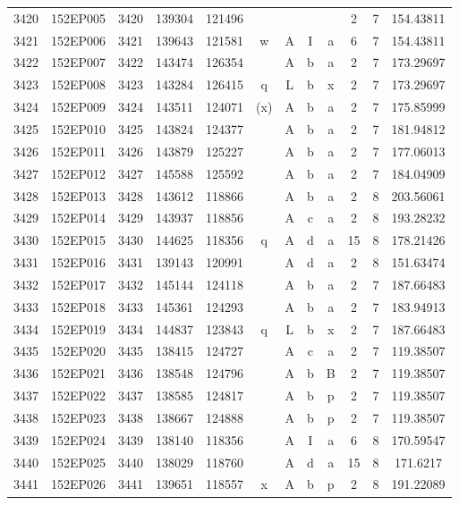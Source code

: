 \begin{tabular}{|*{12}{c|}}
3420 & 152EP005 & 3420 & 139304 & 121496 &  &  &  &  & 2 & 7 & 154.43811 \\ 
3421 & 152EP006 & 3421 & 139643 & 121581 & w & A & I & a & 6 & 7 & 154.43811 \\ 
3422 & 152EP007 & 3422 & 143474 & 126354 &  & A & b & a & 2 & 7 & 173.29697 \\ 
3423 & 152EP008 & 3423 & 143284 & 126415 & q & L & b & x & 2 & 7 & 173.29697 \\ 
3424 & 152EP009 & 3424 & 143511 & 124071 & (x) & A & b & a & 2 & 7 & 175.85999 \\ 
3425 & 152EP010 & 3425 & 143824 & 124377 &  & A & b & a & 2 & 7 & 181.94812 \\ 
3426 & 152EP011 & 3426 & 143879 & 125227 &  & A & b & a & 2 & 7 & 177.06013 \\ 
3427 & 152EP012 & 3427 & 145588 & 125592 &  & A & b & a & 2 & 7 & 184.04909 \\ 
3428 & 152EP013 & 3428 & 143612 & 118866 &  & A & b & a & 2 & 8 & 203.56061 \\ 
3429 & 152EP014 & 3429 & 143937 & 118856 &  & A & c & a & 2 & 8 & 193.28232 \\ 
3430 & 152EP015 & 3430 & 144625 & 118356 & q & A & d & a & 15 & 8 & 178.21426 \\ 
3431 & 152EP016 & 3431 & 139143 & 120991 &  & A & d & a & 2 & 8 & 151.63474 \\ 
3432 & 152EP017 & 3432 & 145144 & 124118 &  & A & b & a & 2 & 7 & 187.66483 \\ 
3433 & 152EP018 & 3433 & 145361 & 124293 &  & A & b & a & 2 & 7 & 183.94913 \\ 
3434 & 152EP019 & 3434 & 144837 & 123843 & q & L & b & x & 2 & 7 & 187.66483 \\ 
3435 & 152EP020 & 3435 & 138415 & 124727 &  & A & c & a & 2 & 7 & 119.38507 \\ 
3436 & 152EP021 & 3436 & 138548 & 124796 &  & A & b & B & 2 & 7 & 119.38507 \\ 
3437 & 152EP022 & 3437 & 138585 & 124817 &  & A & b & p & 2 & 7 & 119.38507 \\ 
3438 & 152EP023 & 3438 & 138667 & 124888 &  & A & b & p & 2 & 7 & 119.38507 \\ 
3439 & 152EP024 & 3439 & 138140 & 118356 &  & A & I & a & 6 & 8 & 170.59547 \\ 
3440 & 152EP025 & 3440 & 138029 & 118760 &  & A & d & a & 15 & 8 & 171.6217 \\ 
3441 & 152EP026 & 3441 & 139651 & 118557 & x & A & b & p & 2 & 8 & 191.22089 \\ 

\end{tabular}
